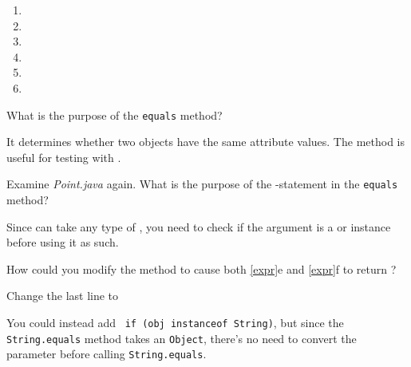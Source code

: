 \begin{multicols}{2}
\setlength{\defaultwidth}{5em}
\begin{enumerate}[itemsep=1pt]
\item {} 
\item {} 
\item {} 
\item {} 
\item {} 
\item {} 
\end{enumerate}
\end{multicols}


\Q What is the purpose of the \texttt{equals} method?

\begin{answer}
It determines whether two objects have the same attribute values.
The  method is useful for testing with .
\end{answer}


\Q Examine {\it Point.java} again.
What is the purpose of the -statement in the \texttt{equals} method?

\begin{answer}
Since  can take any type of , you need to check if the argument is a  or  instance before using it as such.
\end{answer}


\Q How could you modify the  method to cause both \ref{expr}e and \ref{expr}f to return ?

\begin{answer}[5em]
Change the last line to ~

\vspace{1em}
You could instead add ~\texttt{if (obj instanceof String)}, but since the \texttt{String.equals} method takes an \texttt{Object}, there's no need to convert the  parameter before calling \texttt{String.equals}.
\end{answer}
